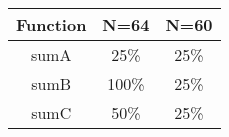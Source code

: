 \documentclass{article}
\begin{document}
\begin{tabular}{c c c}
	Function & N=64 & N=60 \\
	\hline
	sumA & 25\% & 25\% \\
	sumB &  100\% & 25\% \\
	sumC &  50\% & 25\% \\
\end{tabular}
\end{document}
